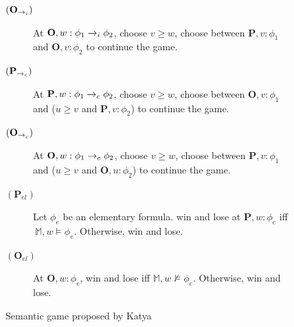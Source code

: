 \begin{figure}
\begin{minipage}[t]{\textwidth}
\begin{description}
\item[$(\mathbf{O}_{\rightarrow_i})$] At $\mathbf{O}, w: \phi_1 \rightarrow_i \phi_2$, \Ic choose $v \geq w$, \You choose between $\mathbf{P}, v:\phi_1$ and $\mathbf{O}, v:\phi_2$ to continue the game.

\vspace{2mm}

\item[$(\mathbf{P}_{\rightarrow_c})$] At $\mathbf{P}, w: \phi_1 \rightarrow_c \phi_2$, \You choose $v \geq w$, \Ic choose between $\mathbf{O}, v:\phi_1$ and ($u \geq v$ and $\mathbf{P}, v:\phi_2$) to continue the game.

\item[$(\mathbf{O}_{\rightarrow_c})$] At $\mathbf{O}, w: \phi_1 \rightarrow_c \phi_2$, \Ic choose $v \geq w$, \You choose between $\mathbf{P}, v:\phi_1$ and ($u \geq v$ and $\mathbf{O}, u:\phi_2$) to continue the game.

\vspace{2mm}







\item[$(\mathbf{P}_{el})$] Let $\phi_{e}$ be an elementary formula. \Ic win and \You lose at $\mathbf{P}, w:\phi_{e}$ iff $~\mathbb{M}, w \models \phi_{e}$. Otherwise, \You win and \Ic lose.

\item[$(\mathbf{O}_{el})$] At $\mathbf{O}, w: \phi_{e}$, \Ic win and \You lose iff $\mathbb{M}, w \not \models \phi_{e}$. Otherwise, \You win and \Ic lose.
\end{description}
    \hrulefill
\end{minipage}
\caption{Semantic game proposed by Katya}
\end{figure}